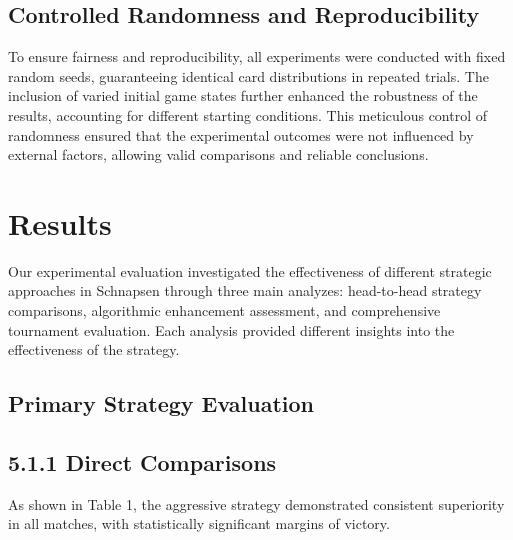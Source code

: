 \documentclass[runningheads]{llncs}
\begin{document}
\subsection{Controlled Randomness and Reproducibility}
To ensure fairness and reproducibility, all experiments were conducted with fixed random seeds, guaranteeing identical card distributions in repeated trials. The inclusion of varied initial game states further enhanced the robustness of the results, accounting for different starting conditions. This meticulous control of randomness ensured that the experimental outcomes were not influenced by external factors, allowing valid comparisons and reliable conclusions.

\section{Results}
Our experimental evaluation investigated the effectiveness of different strategic approaches in Schnapsen \cite{ref_eval_functions} through three main analyzes: head-to-head strategy comparisons, algorithmic enhancement assessment, and comprehensive tournament evaluation. Each analysis provided different insights into the effectiveness of the strategy.
\subsection{Primary Strategy Evaluation}
\subsection{5.1.1 Direct Comparisons}
As shown in Table 1, the aggressive strategy demonstrated consistent superiority in all matches, with statistically significant margins of victory.

\begin{table}[H]
    \caption{Strategy Performance Metrics}
    \label{table:strategy-performance}
    \centering
\end{table}
\end{document}
